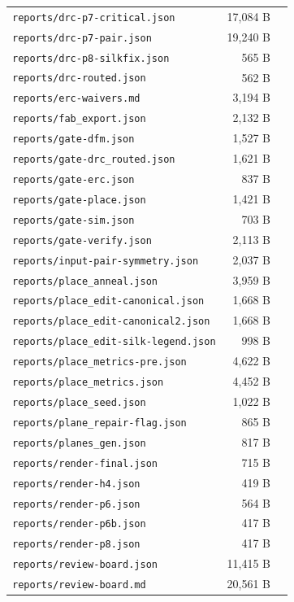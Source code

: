 \documentclass[11pt,a4paper]{article}
\begin{document}
{\begin{longtable}{p{9cm}rp{4cm}}
\texttt{reports/drc-p7-critical.json} & 17,084 B &  \\
\texttt{reports/drc-p7-pair.json} & 19,240 B &  \\
\texttt{reports/drc-p8-silkfix.json} & 565 B &  \\
\texttt{reports/drc-routed.json} & 562 B &  \\
\texttt{reports/erc-waivers.md} & 3,194 B &  \\
\texttt{reports/fab\_export.json} & 2,132 B &  \\
\texttt{reports/gate-dfm.json} & 1,527 B &  \\
\texttt{reports/gate-drc\_routed.json} & 1,621 B &  \\
\texttt{reports/gate-erc.json} & 837 B &  \\
\texttt{reports/gate-place.json} & 1,421 B &  \\
\texttt{reports/gate-sim.json} & 703 B &  \\
\texttt{reports/gate-verify.json} & 2,113 B &  \\
\texttt{reports/input-pair-symmetry.json} & 2,037 B &  \\
\texttt{reports/place\_anneal.json} & 3,959 B &  \\
\texttt{reports/place\_edit-canonical.json} & 1,668 B &  \\
\texttt{reports/place\_edit-canonical2.json} & 1,668 B &  \\
\texttt{reports/place\_edit-silk-legend.json} & 998 B &  \\
\texttt{reports/place\_metrics-pre.json} & 4,622 B &  \\
\texttt{reports/place\_metrics.json} & 4,452 B &  \\
\texttt{reports/place\_seed.json} & 1,022 B &  \\
\texttt{reports/plane\_repair-flag.json} & 865 B &  \\
\texttt{reports/planes\_gen.json} & 817 B &  \\
\texttt{reports/render-final.json} & 715 B &  \\
\texttt{reports/render-h4.json} & 419 B &  \\
\texttt{reports/render-p6.json} & 564 B &  \\
\texttt{reports/render-p6b.json} & 417 B &  \\
\texttt{reports/render-p8.json} & 417 B &  \\
\texttt{reports/review-board.json} & 11,415 B &  \\
\texttt{reports/review-board.md} & 20,561 B &  \\

\end{longtable}}
\end{document}
